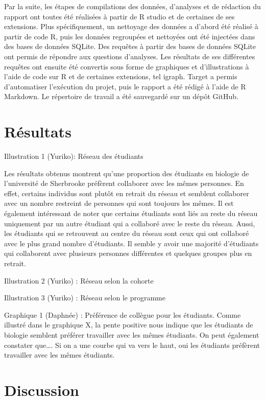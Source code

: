 \documentclass[9pt,twocolumn,twoside,]{pnas-new}
\begin{document}
Par la suite, les étapes de compilations des données, d'analyses et de
rédaction du rapport ont toutes été réalisées à partir de R studio et de
certaines de ses extensions. Plus spécifiquement, un nettoyage des
données a d'abord été réalisé à partir de code R, puis les données
regroupées et nettoyées ont été injectées dans des bases de données
SQLite. Des requêtes à partir des bases de données SQLite ont permis de
répondre aux questions d'analyses. Les résultats de ses différentes
requêtes ont ensuite été convertis sous forme de graphiques et
d'illustrations à l'aide de code sur R et de certaines extensions, tel
igraph. Target a permis d'automatiser l'exécution du projet, puis le
rapport a été rédigé à l'aide de R Markdown. Le répertoire de travail a
été sauvegardé sur un dépôt GitHub.

\hypertarget{ruxe9sultats}{%
\section{Résultats}\label{ruxe9sultats}}

Illustration 1 (Yuriko): Réseau des étudiants

Les résultats obtenus montrent qu'une proportion des étudiants en
biologie de l'université de Sherbrooke préfèrent collaborer avec les
mêmes personnes. En effet, certains individus sont plutôt en retrait du
réseau et semblent collaborer avec un nombre restreint de personnes qui
sont toujours les mêmes. Il est également intéressant de noter que
certains étudiants sont liés au reste du réseau uniquement par un autre
étudiant qui a collaboré avec le reste du réseau. Aussi, les étudiants
qui se retrouvent au centre du réseau sont ceux qui ont collaboré avec
le plus grand nombre d'étudiants. Il semble y avoir une majorité
d'étudiants qui collaborent avec plusieurs personnes différentes et
quelques groupes plus en retrait.

Illustration 2 (Yuriko) : Réseau selon la cohorte

Illustration 3 (Yuriko) : Réseau selon le programme

Graphique 1 (Daphnée) : Préférence de collègue pour les étudiants. Comme
illustré dans le graphique X, la pente positive nous indique que les
étudiants de biologie semblent préférer travailler avec les mêmes
étudiants. On peut également constater que\ldots. Si on a une courbe qui
va vers le haut, oui les étudiants préfèrent travailler avec les mêmes
étudiants.

\hypertarget{discussion}{%
\section{Discussion}\label{discussion}}
\end{document}
